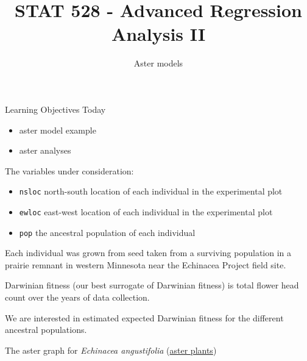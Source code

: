 \documentclass[
  ignorenonframetext,
]{beamer}
\title{STAT 528 - Advanced Regression Analysis II}
\author{Aster models}
\date{}
\institute{Daniel J. Eck\\
Department of Statistics\\
University of Illinois}
\providecommand{\tightlist}{%
  \setlength{\itemsep}{0pt}\setlength{\parskip}{0pt}}
\begin{document}
\frame{\titlepage}

\begin{frame}
\newcommand{\R}{\mathbb{R}}
\end{frame}

\begin{frame}{Learning Objectives Today}
\protect\hypertarget{learning-objectives-today}{}
\begin{itemize}
\tightlist
\item
  aster model example
\item
  aster analyses
\end{itemize}
\end{frame}

\begin{frame}{}
\protect\hypertarget{section}{}
The variables under consideration:

\begin{itemize}
\tightlist
\item
  \texttt{nsloc} north-south location of each individual in the
  experimental plot
\item
  \texttt{ewloc} east-west location of each individual in the
  experimental plot
\item
  \texttt{pop} the ancestral population of each individual
\end{itemize}

\vspace{12pt}

Each individual was grown from seed taken from a surviving population in
a prairie remnant in western Minnesota near the Echinacea Project field
site.

Darwinian fitness (our best surrogate of Darwinian fitness) is total
flower head count over the years of data collection.

We are interested in estimated expected Darwinian fitness for the
different ancestral populations.
\end{frame}

\begin{frame}{The aster graph for \emph{Echinacea angustifolia}
(\href{http://echinaceaproject.org/}{aster plants})}
\protect\hypertarget{the-aster-graph-for-aster-plants}{}
\begin{figure}
\label{fig:astergraph}
\end{figure}
\end{frame}
\end{document}
